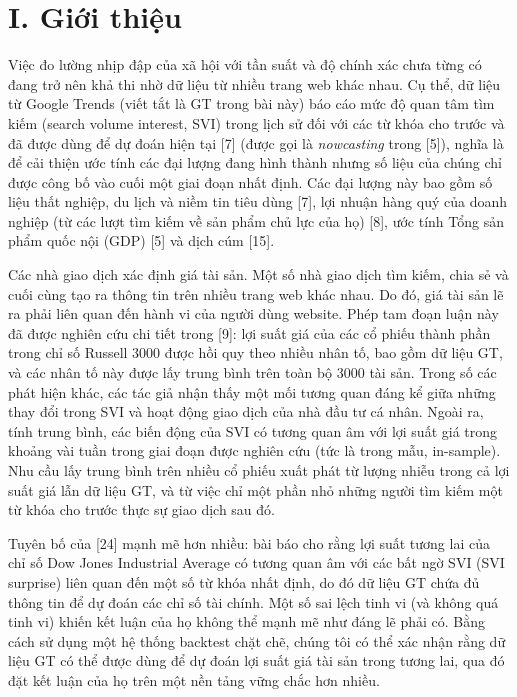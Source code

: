 \section{I. Giới thiệu}

Việc đo lường nhịp đập của xã hội với tần suất và độ chính xác chưa từng có đang trở nên khả thi nhờ dữ liệu từ nhiều trang web khác nhau. Cụ thể, dữ liệu từ Google Trends (viết tắt là GT trong bài này) báo cáo mức độ quan tâm tìm kiếm (search volume interest, SVI) trong lịch sử đối với các từ khóa cho trước và đã được dùng để dự đoán hiện tại [7] (được gọi là \emph{nowcasting} trong [5]), nghĩa là để cải thiện ước tính các đại lượng đang hình thành nhưng số liệu của chúng chỉ được công bố vào cuối một giai đoạn nhất định. Các đại lượng này bao gồm số liệu thất nghiệp, du lịch và niềm tin tiêu dùng [7], lợi nhuận hàng quý của doanh nghiệp (từ các lượt tìm kiếm về sản phẩm chủ lực của họ) [8], ước tính Tổng sản phẩm quốc nội (GDP) [5] và dịch cúm [15].

Các nhà giao dịch xác định giá tài sản. Một số nhà giao dịch tìm kiếm, chia sẻ và cuối cùng tạo ra thông tin trên nhiều trang web khác nhau. Do đó, giá tài sản lẽ ra phải liên quan đến hành vi của người dùng website. Phép tam đoạn luận này đã được nghiên cứu chi tiết trong [9]: lợi suất giá của các cổ phiếu thành phần trong chỉ số Russell 3000 được hồi quy theo nhiều nhân tố, bao gồm dữ liệu GT, và các nhân tố này được lấy trung bình trên toàn bộ 3000 tài sản. Trong số các phát hiện khác, các tác giả nhận thấy một mối tương quan đáng kể giữa những thay đổi trong SVI và hoạt động giao dịch của nhà đầu tư cá nhân. Ngoài ra, tính trung bình, các biến động của SVI có tương quan âm với lợi suất giá trong khoảng vài tuần trong giai đoạn được nghiên cứu (tức là trong mẫu, in-sample). Nhu cầu lấy trung bình trên nhiều cổ phiếu xuất phát từ lượng nhiễu trong cả lợi suất giá lẫn dữ liệu GT, và từ việc chỉ một phần nhỏ những người tìm kiếm một từ khóa cho trước thực sự giao dịch sau đó.

Tuyên bố của [24] mạnh mẽ hơn nhiều: bài báo cho rằng lợi suất tương lai của chỉ số Dow Jones Industrial Average có tương quan âm với các bất ngờ SVI (SVI surprise) liên quan đến một số từ khóa nhất định, do đó dữ liệu GT chứa đủ thông tin để dự đoán các chỉ số tài chính. Một số sai lệch tinh vi (và không quá tinh vi) khiến kết luận của họ không thể mạnh mẽ như đáng lẽ phải có. Bằng cách sử dụng một hệ thống backtest chặt chẽ, chúng tôi có thể xác nhận rằng dữ liệu GT có thể được dùng để dự đoán lợi suất giá tài sản trong tương lai, qua đó đặt kết luận của họ trên một nền tảng vững chắc hơn nhiều.

